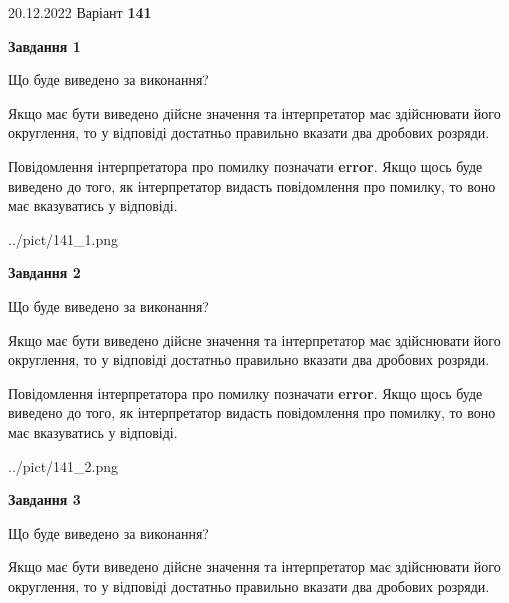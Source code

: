 \documentclass[12pt, ukrainian]{article}
\begin{document}
{20.12.2022 Варіант \No \textbf { 141 }\par}
{
\begin {Large}

{\begin {center}\textbf{Завдання 1}\end {center}}\par
Що буде виведено за виконання? \par

Якщо має бути виведено дійсне значення та інтерпретатор має здійснювати його округлення, 
то у відповіді достатньо правильно вказати два дробових розряди.

Повідомлення інтерпретатора про помилку позначати \textbf{error}.
Якщо щось буде виведено до того, як інтерпретатор видасть повідомлення про помилку, 
то воно має вказуватись у відповіді. \par

\begin{center}
	{../pict/141_1.png}
\end{center}
\newpage

{\begin {center}\textbf{Завдання 2}\end {center}}\par
Що буде виведено за виконання? \par

Якщо має бути виведено дійсне значення та інтерпретатор має здійснювати його округлення, 
то у відповіді достатньо правильно вказати два дробових розряди.

Повідомлення інтерпретатора про помилку позначати \textbf{error}.
Якщо щось буде виведено до того, як інтерпретатор видасть повідомлення про помилку, 
то воно має вказуватись у відповіді. \par

\begin{center}
	{../pict/141_2.png}
\end{center}
\newpage

{\begin {center}\textbf{Завдання 3}\end {center}}\par
Що буде виведено за виконання? \par

Якщо має бути виведено дійсне значення та інтерпретатор має здійснювати його округлення, 
то у відповіді достатньо правильно вказати два дробових розряди.


\end{Large}}
\end{document}
